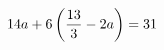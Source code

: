 \documentclass[preview]{standalone}
\begin{document}
\begin{align*}
\special{dvisvgm:raw <g id='unique000'>}14a+6\left(\dfrac{13}{3}-2a\right)=31\special{dvisvgm:raw </g>}
\end{align*}
\end{document}
